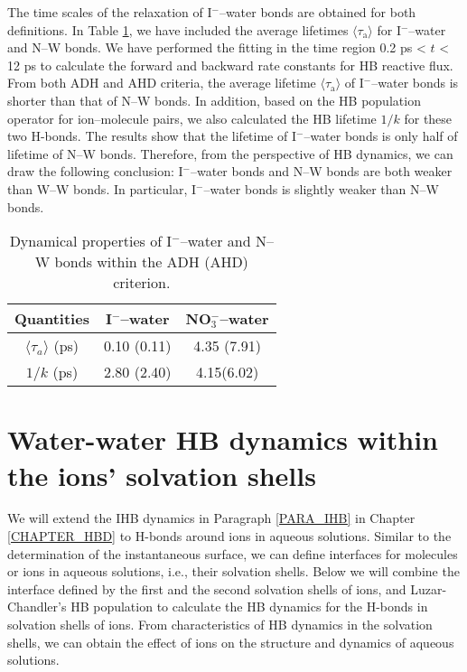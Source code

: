 The time scales of the relaxation of I$^-$--water bonds are obtained for both definitions. 
In Table \ref{tab:properties_anion-water_hbs}, we have included the average lifetimes $\langle\tau_\text{a}\rangle$ for I$^-$--water and N--W bonds. 
We have performed the fitting in the time region 0.2 ps < $t$ < 12 ps to calculate the forward and backward rate constants for HB reactive flux.
From both ADH and AHD criteria, the average lifetime $\langle\tau_\text{a}\rangle$ of I$^-$--water bonds is shorter than that of N--W bonds.
In addition, based on the HB population operator for ion--molecule pairs, we also calculated the HB lifetime $1/k$ for these two H-bonds. 
The results show that the lifetime of I$^-$--water bonds is only half of lifetime of N--W bonds. Therefore, from the perspective of HB dynamics,
we can draw the following conclusion: I$^-$--water bonds and N--W bonds are both weaker than W--W bonds. In particular, 
I$^-$--water bonds is slightly weaker than N--W bonds.
\begin{table}[htbp]
\centering
\caption{ 
    Dynamical properties of I$^-$--water and N--W bonds within the ADH (AHD) criterion.} 
\begin{tabular}{ccc}
\label{tab:properties_anion-water_hbs}
 Quantities  & I$^-$--water & NO$_3^-$--water \\
\hline
  $\langle\tau_a\rangle$ (ps) & 0.10 (0.11) & 4.35 (7.91) \\
  $1/k$ (ps) & 2.80 (2.40) & 4.15(6.02) \\
\end{tabular} %
\end{table}

\FloatBarrier
\section{Water-water HB dynamics within the ions' solvation shells} \label{PARA_SHBD}
We will extend the IHB dynamics in Paragraph \ref{PARA_IHB} in Chapter \ref{CHAPTER_HBD} to H-bonds around ions in aqueous solutions. 
Similar to the determination of the instantaneous surface, we can define interfaces for molecules or ions in aqueous solutions, i.e., 
their solvation shells. 
Below we will combine the interface defined by the first and the second solvation shells of ions, 
and Luzar-Chandler's HB population \cite{AL96} to calculate the HB
dynamics for the H-bonds in solvation shells of ions.
From characteristics of HB dynamics in the solvation shells, we can obtain the effect of ions on the structure and dynamics of aqueous solutions. 

